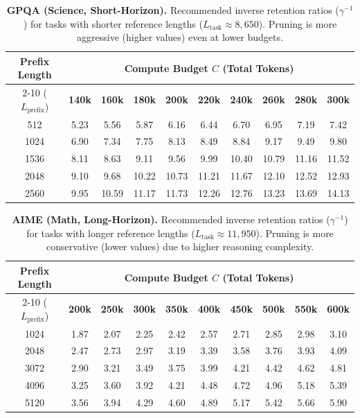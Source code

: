 \documentclass[11pt]{article}
\theoremstyle{plain}
\begin{document}
\begin{table}[t]
    \centering
    \small
    \setlength{\tabcolsep}{5pt}
    \caption{\textbf{GPQA (Science, Short-Horizon).} Recommended inverse retention ratios ($\gamma^{-1}$) for tasks with shorter reference lengths ($L_{\text{task}} \approx 8{,}650$). Pruning is more aggressive (higher values) even at lower budgets.}
    \label{tab:gamma_lookup_gpqa}
    \begin{tabular}{c ccccccccc}
    \toprule
    \multirow{2}{*}{\textbf{Prefix Length}} & \multicolumn{9}{c}{\textbf{Compute Budget $C$ (Total Tokens)}} \\
    \cmidrule(lr){2-10}
    ($L_{\text{prefix}}$) & \textbf{140k} & \textbf{160k} & \textbf{180k} & \textbf{200k} & \textbf{220k} & \textbf{240k} & \textbf{260k} & \textbf{280k} & \textbf{300k} \\
    \midrule
    512   & 5.23 & 5.56 & 5.87 & 6.16 & 6.44 & 6.70 & 6.95 & 7.19 & 7.42 \\
    1024  & 6.90 & 7.34 & 7.75 & 8.13 & 8.49 & 8.84 & 9.17 & 9.49 & 9.80 \\
    1536  & 8.11 & 8.63 & 9.11 & 9.56 & 9.99 & 10.40 & 10.79 & 11.16 & 11.52 \\
    2048  & 9.10 & 9.68 & 10.22 & 10.73 & 11.21 & 11.67 & 12.10 & 12.52 & 12.93 \\
    2560  & 9.95 & 10.59 & 11.17 & 11.73 & 12.26 & 12.76 & 13.23 & 13.69 & 14.13 \\
    \bottomrule
    \end{tabular}
\end{table}

\begin{table}[t]
    \centering
    \small
    \setlength{\tabcolsep}{5pt}
    \caption{\textbf{AIME (Math, Long-Horizon).} Recommended inverse retention ratios ($\gamma^{-1}$) for tasks with longer reference lengths ($L_{\text{task}} \approx 11{,}950$). Pruning is more conservative (lower values) due to higher reasoning complexity.}
    \label{tab:gamma_lookup_aime}
    \begin{tabular}{c ccccccccc}
    \toprule
    \multirow{2}{*}{\textbf{Prefix Length}} & \multicolumn{9}{c}{\textbf{Compute Budget $C$ (Total Tokens)}} \\
    \cmidrule(lr){2-10}
    ($L_{\text{prefix}}$) & \textbf{200k} & \textbf{250k} & \textbf{300k} & \textbf{350k} & \textbf{400k} & \textbf{450k} & \textbf{500k} & \textbf{550k} & \textbf{600k} \\
    \midrule
    1024  & 1.87 & 2.07 & 2.25 & 2.42 & 2.57 & 2.71 & 2.85 & 2.98 & 3.10 \\
    2048  & 2.47 & 2.73 & 2.97 & 3.19 & 3.39 & 3.58 & 3.76 & 3.93 & 4.09 \\
    3072  & 2.90 & 3.21 & 3.49 & 3.75 & 3.99 & 4.21 & 4.42 & 4.62 & 4.81 \\
    4096  & 3.25 & 3.60 & 3.92 & 4.21 & 4.48 & 4.72 & 4.96 & 5.18 & 5.39 \\
    5120  & 3.56 & 3.94 & 4.29 & 4.60 & 4.89 & 5.17 & 5.42 & 5.66 & 5.90 \\
    \bottomrule
    \end{tabular}
\end{table}
\end{document}
